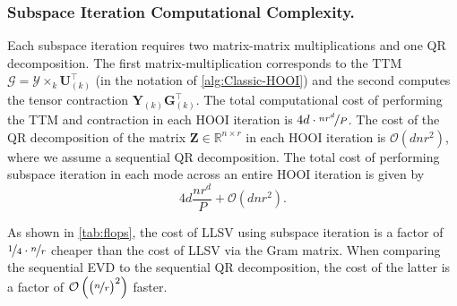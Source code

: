     \subsubsection{Subspace Iteration Computational Complexity.}
        Each subspace iteration requires two matrix-matrix multiplications and
        one QR decomposition. The first matrix-multiplication corresponds to the
        TTM $\mathcal{G}=\mathcal{Y} \times_k \mathbf{U}_{(k)}^\intercal$ (in the
        notation of \cref{alg:Classic-HOOI}) and the second computes the tensor
        contraction $\mathbf{Y}_{(k)}\mathbf{G}_{(k)}^\intercal$. The total computational cost of
        performing the TTM and contraction in each HOOI iteration is
        $4d\cdot\nicefrac{nr^d}{P}$. The cost of the QR decomposition of the
        matrix $\mathbf{Z} \in \mathbb{R}^{n\times r}$ in each HOOI iteration is
        $\mathcal{O}(dnr^2)$, where we assume a sequential QR decomposition. The
        total cost of performing subspace iteration in each mode across an
        entire HOOI iteration is given by
        \begin{equation*}
            4d\frac{nr^d}{P} + \mathcal{O}(dnr^2).
        \end{equation*}

        As shown in \cref{tab:flops}, the cost of LLSV using subspace iteration is a
        factor of $\nicefrac{1}{4} \cdot \nicefrac{n}{r}$ cheaper than the cost of LLSV via the
        Gram matrix.
        When comparing the sequential EVD to the sequential QR decomposition,
        the cost of the latter is a factor of
        $\mathcal{O}\left(\big(\nicefrac{n}{r}\big)^2\right)$ faster.

